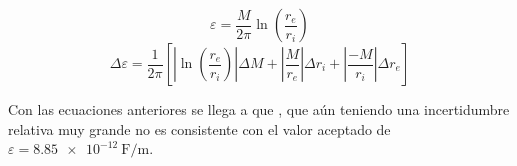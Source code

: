 \begin{equation}
    \label{ec:epsilon:epsilon}
    \varepsilon = \frac{M}{2\pi} \ln \left(\frac{r_e}{r_i}\right)
\end{equation}
\vspace{5mm}
\begin{equation}
    \label{ec:epsilon:error-epsilon}
    \Delta \varepsilon = \frac{1}{2\pi} \left[ 
            \left| \ln\left(\frac{r_e}{r_i}\right) \right| \Delta M +
            \left| \frac{M}{r_e} \right| \Delta r_i + 
            \left| \frac{-M}{r_i} \right| \Delta r_e
        \right]
\end{equation}

\vspace{5mm}
Con las ecuaciones anteriores se llega a que , que
aún teniendo una incertidumbre relativa muy grande no es consistente con el
valor aceptado de $\varepsilon = \SI{8.85e-12}{\farad\per\meter}$.

